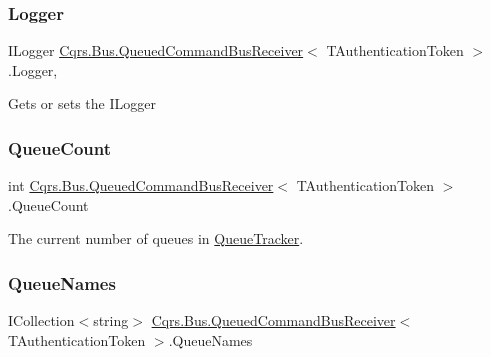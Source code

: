 \subsubsection{\texorpdfstring{Logger}{Logger}}
{\footnotesize\ttfamily I\+Logger \hyperlink{classCqrs_1_1Bus_1_1QueuedCommandBusReceiver}{Cqrs.\+Bus.\+Queued\+Command\+Bus\+Receiver}$<$ T\+Authentication\+Token $>$.Logger\hspace{0.3cm}{\ttfamily [get]}, {\ttfamily [protected]}}



Gets or sets the I\+Logger 

\mbox{\label{classCqrs_1_1Bus_1_1QueuedCommandBusReceiver_aefae09fd32d799ac59d35eb706f76654_aefae09fd32d799ac59d35eb706f76654}} 
\subsubsection{\texorpdfstring{Queue\+Count}{QueueCount}}
{\footnotesize\ttfamily int \hyperlink{classCqrs_1_1Bus_1_1QueuedCommandBusReceiver}{Cqrs.\+Bus.\+Queued\+Command\+Bus\+Receiver}$<$ T\+Authentication\+Token $>$.Queue\+Count\hspace{0.3cm}{\ttfamily [get]}}



The current number of queues in \hyperlink{classCqrs_1_1Bus_1_1QueuedCommandBusReceiver_a2fc62989429929acd8ea66808a8c4a78_a2fc62989429929acd8ea66808a8c4a78}{Queue\+Tracker}. 

\mbox{\label{classCqrs_1_1Bus_1_1QueuedCommandBusReceiver_a959facef20063d615b427eafa4290e0f_a959facef20063d615b427eafa4290e0f}} 
\subsubsection{\texorpdfstring{Queue\+Names}{QueueNames}}
{\footnotesize\ttfamily I\+Collection$<$string$>$ \hyperlink{classCqrs_1_1Bus_1_1QueuedCommandBusReceiver}{Cqrs.\+Bus.\+Queued\+Command\+Bus\+Receiver}$<$ T\+Authentication\+Token $>$.Queue\+Names\hspace{0.3cm}{\ttfamily [get]}}



